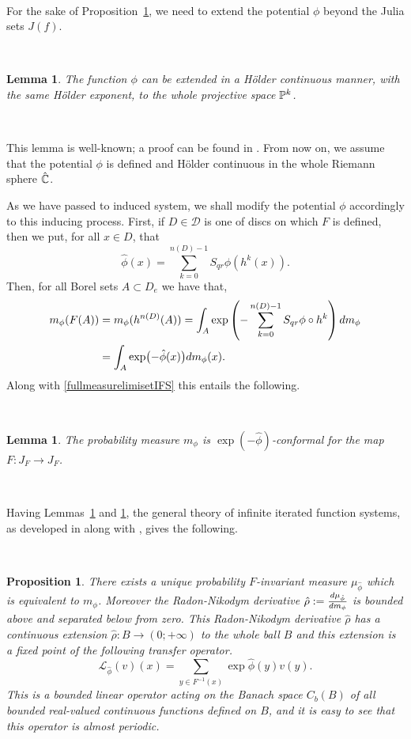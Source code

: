 \documentclass[12pt]{amsart}
\numberwithin{equation}{section}
\newcommand{\nl}{\newline}
\newtheorem{prop}[thm]{Proposition}
\newtheorem{lem}[thm]{Lemma}
\def\({\bigl(}                \def\){\bigr)}
\def\lt{\left}                \def\rt{\right}
\def\sp{\medskip}             \def\fr{\noindent}        \def\nl{\newline}
\begin{document}
\

\fr For the sake of Proposition~\ref{muphiFinvariant}, we need to extend the
potential $\phi$ beyond the Julia sets $J(f)$. 

\

\begin{lem}\label{holderextension}
The function $\phi$ can be extended in a H\"older continuous manner,
with the same H\"older exponent, to the whole projective space ${\mathbb P}^k$.  
\end{lem}

\

\fr This lemma is well-known; a proof can be found in \cite{uzpk}.
From now on, we assume that the potential $\phi$ is defined and
H\"older continuous in the whole Riemann sphere $\hat {{\mathbb C}}$. 

\sp\fr As we have passed to induced system, we shall modify the potential
$\phi$ accordingly to this inducing process. 
First, if $D\in\mathcal{D}$ is one of discs on which $F$ is defined,
then we put, for all $x\in D$, that
$$
\hat\phi(x)=\sum_{k=0}^{n(D)-1}S_{qr}\phi(h^k(x)).
$$
Then, for all Borel sets $A\subset D_e$ we have that,
$$
\aligned
m_\phi(F(A))
&=m_\phi(h^{n(D)}(A))
=\int_A\exp\lt(-\sum_{k=0}^{n(D)-1}S_{qr}\phi\circ h^k\rt)dm_\phi \\
&=\int_A\exp\(-\hat\phi(x)\)dm_\phi(x).
\endaligned
$$
Along with \eqref{fullmeasurelimisetIFS} this entails the following.

\

\begin{lem}\label{mphiFconformality}
The probability measure $m_\phi$ is $\exp(-\hat\phi)$-conformal for the
map $F:J_F\to J_F$. 
\end{lem}

\

\fr Having Lemmas~\ref{mphiFconformality} and \ref{holderextension}, the
general theory of infinite iterated function systems, as developed 
in \cite{mu} along with \cite{MU}, gives the following.

\

\begin{prop}\label{muphiFinvariant}
There exists a unique probability $F$-invariant measure
$\mu_{\hat\phi}$ which is equivalent to $m_\phi$. Moreover the
Radon-Nikodym derivative $\hat\rho:={{d\mu_{\hat\phi}}\over{d m_\phi}}$
is bounded above and separated below from zero. This Radon-Nikodym
derivative $\hat\rho$ has a continuous extension $\hat\rho:B\to
(0;+\infty)$ to the whole ball $B$ and this extension is a fixed point
of the following transfer operator.
$$
\mathcal{L}_{\hat\phi}(v)(x)
=\sum_{y\in  F^{-1}(x)}\exp\hat\phi(y)v(y).
$$
This is a bounded linear operator acting on the Banach space $C_b(B)$
of all bounded real-valued continuous functions defined on $B$, and it is easy
to see that this operator is almost periodic. 
\end{prop}
\end{document}
